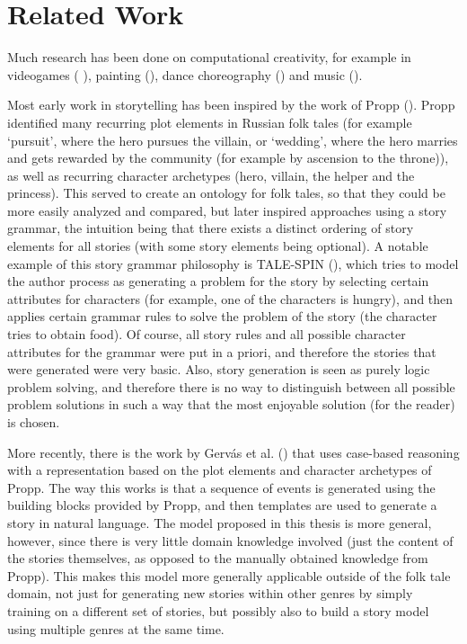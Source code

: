 \section{Related Work}

Much research has been done on computational creativity, for example in
videogames (\cite{liapis2014computational} \cite{crawford1998computer}), painting
(\cite{colton2015painting}), dance choreography (\cite{carlson2011scuddle}) and
music (\cite{johnson2014musical}).

Most early work in storytelling has been inspired by the work of Propp
(\cite{propp1968morphology}). Propp identified many recurring plot elements in
Russian folk tales (for example `pursuit', where the hero pursues the villain, or
`wedding', where the hero marries and gets rewarded by the community (for example
by ascension to the throne)), as well as recurring character archetypes (hero, villain,
the helper and the princess). This served to create an ontology for folk tales,
so that they could be more easily analyzed and compared, but later inspired
approaches using a story grammar, the intuition being that there exists a distinct
ordering of story elements for all stories (with some story elements being optional). A
notable example of this story grammar philosophy is TALE-SPIN
(\cite{meehan1977tale}), which tries to model the author process as generating
a problem for the story by selecting certain attributes for characters (for example, one of the characters is hungry), and then
applies certain grammar rules to solve the problem of the story (the character
tries to obtain food).
Of course, all story rules and all possible character attributes for the grammar were put in
a priori, and therefore the stories that were generated were very basic. Also,
story generation is seen as purely logic problem solving, and therefore there
is no way to distinguish between all possible problem solutions in such a way that the
most enjoyable solution (for the reader) is chosen.

More recently, there
is the work by Gerv\'as et al. (\cite{Gervas2005235}) that uses case-based
reasoning with a representation based on the plot elements and character
archetypes of Propp. The way this works is that a sequence of events is generated using the
building blocks provided by Propp, and then templates are used to generate a
story in natural language.
The model proposed in this thesis is more general, however, since there is very
little domain knowledge involved (just the content of the stories themselves, as
opposed to the manually obtained knowledge from Propp).
This makes this model more generally applicable outside of the folk tale domain,
not just for generating new stories within other genres by simply training on a
different set of stories, but possibly also to
build a story model using multiple genres at the same time.

